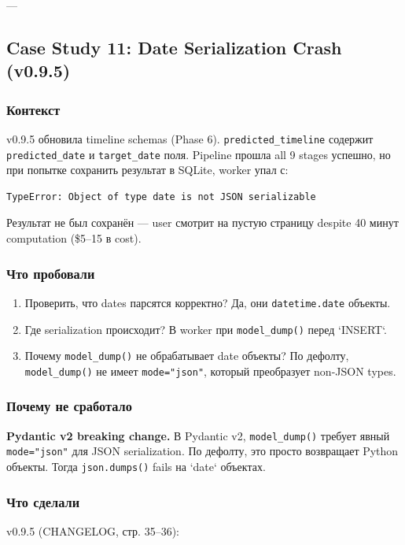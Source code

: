 ---

\subsection{Case Study 11: Date Serialization Crash (v0.9.5)}

\subsubsection*{Контекст}
v0.9.5 обновила timeline schemas (Phase 6). \texttt{predicted\_timeline} содержит \texttt{predicted\_date} и \texttt{target\_date} поля. Pipeline прошла all 9 stages успешно, но при попытке сохранить результат в SQLite, worker упал с:

\begin{verbatim}
TypeError: Object of type date is not JSON serializable
\end{verbatim}

Результат не был сохранён --- user смотрит на пустую страницу despite 40 минут computation (\$5--15 в cost).

\subsubsection*{Что пробовали}
\begin{enumerate}
\item Проверить, что dates парсятся корректно? Да, они \texttt{datetime.date} объекты.
\item Где serialization происходит? В worker при \texttt{model\_dump()} перед `INSERT`.
\item Почему \texttt{model\_dump()} не обрабатывает date объекты? По дефолту, \texttt{model\_dump()} не имеет \texttt{mode="json"}, который преобразует non-JSON types.
\end{enumerate}

\subsubsection*{Почему не сработало}
\textbf{Pydantic v2 breaking change.} В Pydantic v2, \texttt{model\_dump()} требует явный \texttt{mode="json"} для JSON serialization. По дефолту, это просто возвращает Python объекты. Тогда \texttt{json.dumps()} fails на `date` объектах.

\subsubsection*{Что сделали}
v0.9.5 (CHANGELOG, стр. 35--36):


